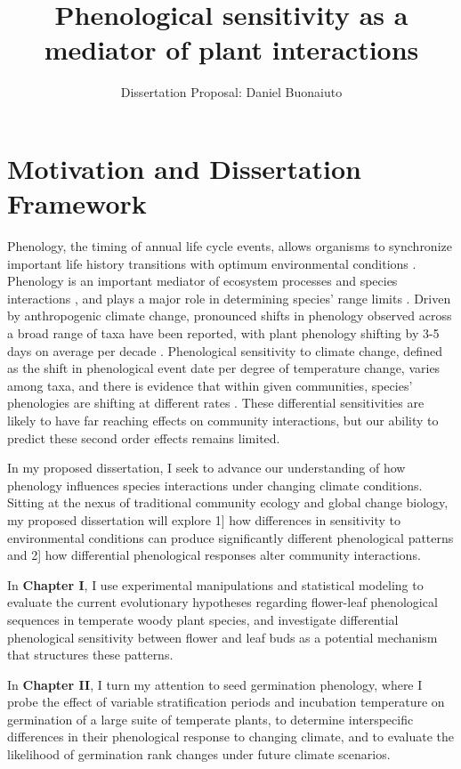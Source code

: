 \documentclass[12pt]{article}\usepackage[]{graphicx}\usepackage[]{color}
\begin{document}
\title{Phenological sensitivity as a mediator of plant interactions}
\author{Dissertation Proposal: Daniel Buonaiuto}
\maketitle{}
\section*{Motivation and Dissertation Framework}
\indent\indent Phenology, the timing of annual life cycle events, allows organisms to synchronize important life history transitions with optimum environmental conditions \citep{Forrest2010}. Phenology is an important mediator of ecosystem processes \citep{Piao2007,Cleland2007} and species interactions \citep{Yang2010,Leverett2017}, and plays a major role in determining species' range limits \citep{Chuine2001}. Driven by anthropogenic climate change, pronounced shifts in phenology observed across a broad range of taxa have been reported, with plant phenology shifting by 3-5 days on average per decade \citep{Parmesan2003,Menzel2006,Root2003}. Phenological sensitivity to climate change, defined as the shift in phenological event date per degree of temperature change, varies among taxa, and there is evidence that within given communities, species' phenologies are shifting at different rates \citep{Cleland2012,Ovaskainen2013}. These differential sensitivities are likely to have far reaching effects on community interactions, but our ability to predict these second order effects remains limited.
\par In my proposed dissertation, I seek to advance our understanding of how phenology influences species interactions under changing climate conditions. Sitting at the nexus of traditional community ecology and global change biology, my proposed dissertation will explore 1] how differences in sensitivity to environmental conditions can produce significantly different phenological patterns and 2] how differential phenological responses alter community interactions.
\par In \textbf{Chapter I}, I use experimental manipulations and statistical modeling to evaluate the current evolutionary hypotheses regarding flower-leaf phenological sequences in temperate woody plant species, and investigate differential phenological sensitivity between flower and leaf buds as a potential mechanism that structures these patterns.
\par In \textbf{Chapter II}, I turn my attention to seed germination phenology, where I probe the effect of variable stratification periods and incubation temperature on germination of a large suite of temperate plants, to determine interspecific differences in their phenological response to changing climate, and to evaluate the likelihood of germination rank changes under future climate scenarios.
\end{document}
